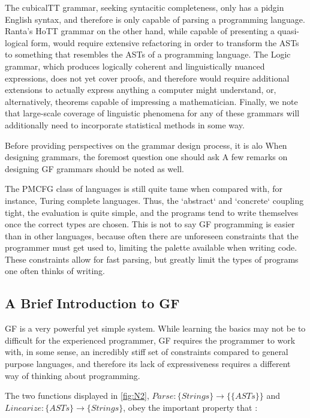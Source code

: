 The cubicalTT grammar, seeking syntacitic completeness, only has a pidgin
English syntax, and therefore is only capable of parsing a programming language.
Ranta's HoTT grammar on the other hand, while capable of presenting a
quasi-logical form, would require extensive refactoring in order to transform
the ASTs to something that resembles the ASTs of a programming language. The
Logic grammar, which produces logically coherent and linguistically nuanced
expressions, does not yet cover proofs, and therefore would require additional extensions
to actually express anything a computer might understand, or, alternatively,
theorems capable of impressing a mathematician. Finally, we note that large-scale
coverage of linguistic phenomena for any of these grammars will additionally
need to incorporate statistical methods in some way. 

Before providing perspectives on the grammar design process, it is alo 
When designing grammars, the foremost question one should ask
A few remarks on designing GF grammars should be noted as well. 

The PMCFG class of languages is still quite tame when compared with, for
instance, Turing complete languages. Thus, the `abstract` and `concrete`
coupling tight, the evaluation is quite simple, and the programs tend to write
themselves once the correct types are chosen. This is not to say GF programming
is easier than in other languages, because often there are unforeseen
constraints that the programmer must get used to, limiting the palette available
when writing code. These constraints allow for fast parsing, but greatly limit
the types of programs one often thinks of writing.

\subsection{A Brief Introduction to GF}

GF is a very powerful yet simple system.  While learning the basics may not be
to difficult for the experienced programmer, GF requires the programmer to work
with, in some sense, an incredibly stiff set of constraints compared to general
purpose languages, and therefore its lack of expressiveness requires a different
way of thinking about programming.

The two functions displayed in \autoref{fig:N2}, $Parse : \{Strings\}
\rightarrow \{\{ASTs\}\}$ and $Linearize : \{ASTs\} \rightarrow \{Strings\}$, obey
the important property that :

